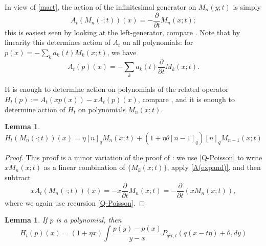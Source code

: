 \documentclass{amsart}
\newtheorem{lemma}[theorem]{Lemma}
\theoremstyle{definition}
\theoremstyle{remark}
\theoremstyle{remark}
\theoremstyle{definition}
\numberwithin{equation}{section}
\begin{document}
In view of \eqref{mart}, the action of the infinitesimal generator on $M_n(y;t)$ is simply
\begin{equation*}
  A_t(M_n(\cdot;t))(x)=-\frac{\partial}{\partial t}M_n(x;t);
\end{equation*}
this is easiest seen by looking at the left-generator, compare \cite[Lemma 2.1]{Bryc-Wesolowski-2013-gener}. Note that by linearity this determines action of $A_t$ on all polynomials:
for $p(x)=-\sum_{k} a_k(t)M_k(x;t)$, we have
\begin{equation}
  \label{A(expand)}
  A_t(p)(x)=-\sum_k a_k(t) \frac{\partial}{\partial t}M_k(x;t).
\end{equation}

It is enough to determine action on polynomials of the related operator $H_t(p):=A_t(x p(x))-x A_t(p)(x)$, compare \cite[Eqtn. (13)]{Bryc-Wesolowski-2013-gener}, and
it is enough to determine action of $H_t$ on polynomials $M_n(x;t)$.
\begin{lemma}
  \label{L:HM}
 \begin{equation}
   \label{HonM}
    H_t(M_n(\cdot;t))(x)=\eta {\left[{n}\right]_{q}} M_n(x;t)+(1+\eta\theta{\left[{n-1}\right]_{q}}){\left[{n}\right]_{q}}M_{n-1}(x;t)
 \end{equation}
\end{lemma}
\begin{proof}
  This proof is a minor variation of the proof of \cite[Lemma 2.2]{Bryc-Wesolowski-2013-gener}: we use \eqref{Q-Poisson} to write
  $x M_n(x;t)$ as a linear combination of $\{M_k(x;t)\}$, apply \eqref{A(expand)}, and then subtract
  $$x A_t(M_n(\cdot;t))(x)=-x\frac{\partial}{\partial t}M_n(x;t)=-\frac{\partial}{\partial t}\left(xM_n(x;t)\right),$$
  where we again use recursion \eqref{Q-Poisson}.
\end{proof}
\begin{lemma}
  \label{L:H-rep} If $p$ is a polynomial, then
  \begin{equation}
    \label{H-integral}
    H_t(p)(x)=(1+\eta x) \int \frac{p(y)-p(x)}{y-x} P_{q^2 t, t}(q(x-t\eta)+\theta,dy)
  \end{equation}
\end{lemma}
\end{document}
